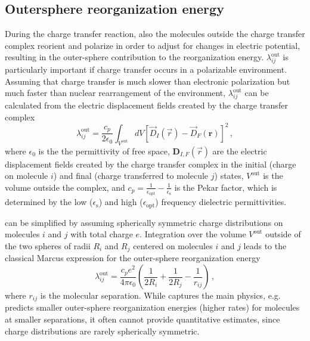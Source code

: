 \subsection{Outersphere reorganization energy}
\label{sec:outer_reorganization}
During the charge transfer reaction, also the molecules outside the charge transfer complex reorient and polarize in order to adjust for changes in electric potential, resulting in the outer-sphere contribution to the reorganization energy. $\lambda_{ij}^\text{out}$ is particularly important if charge transfer occurs in a polarizable environment. Assuming that charge transfer is much slower than electronic polarization but much faster than nuclear rearrangement of the environment, $\lambda_{ij}^\text{out}$ can be calculated from the electric displacement fields created by the charge transfer complex~\cite{may_charge_2011}
\begin{equation}
\lambda_{ij}^\text{out}=
\frac{c_p}{2\epsilon_0}\int_{V^\text{out}}d V
\left[ \vec{D}_I(\vec{r}) - \vec{D}_F(\bm r) \right]^2\,,
\label{equ:lambda_outer1}
\end{equation}
where $\epsilon_0$ is the the permittivity of free space, $\bm{D}_{I,F}(\vec{r})$ are the electric displacement fields created by the charge transfer complex in the initial (charge on molecule $i$) and final (charge transferred to molecule $j$) states,  $V^\text{out}$ is the volume outside the complex, and $c_p=\frac{1}{\epsilon_\text{opt}}-\frac{1}{\epsilon_\text{s}}$ is the Pekar factor, which is determined by the low ($\epsilon_\text{s}$) and high ($\epsilon_\text{opt}$) frequency dielectric permittivities.

 can be simplified by assuming spherically symmetric charge distributions on molecules $i$ and $j$ with total charge $e$. Integration over the volume $V^\text{out}$ outside of the two spheres of radii $R_i$ and $R_j$ centered on molecules $i$ and $j$ leads to the classical Marcus expression for the outer-sphere reorganization energy
\begin{equation}
\lambda_{ij}^\text{out}=\frac{c_{p}e^2}{4\pi\epsilon_0}\left(\frac{1}{2 R_i}+\frac{1}{2 R_j}-\frac{1}{r_{ij}} \right)\,,
\label{equ:lambda_outer2}
\end{equation}
where $r_{ij}$ is the molecular separation.  While  captures the main physics, e.g. predicts smaller outer-sphere reorganization energies (higher rates) for molecules at smaller separations, it often cannot provide quantitative estimates, since charge distributions are rarely spherically symmetric. 

